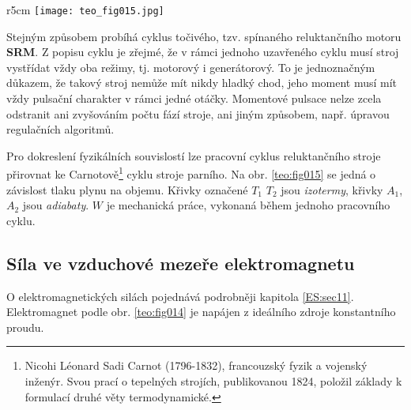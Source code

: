 {      \begin{wrapfigure}[12]{r}{5cm}  %
        \centering
        \texttt{[image: teo\_fig015.jpg]}
        \caption{Carnotův cyklus parního stroje.
                 (\cite[s.~165]{Patocka4})}
        \label{teo:fig015}
      \end{wrapfigure}
      Stejným způsobem probíhá cyklus točivého, tzv. spínaného reluktančního motoru \textbf{SRM}. Z 
      popisu cyklu je zřejmé, že v rámci jednoho uzavřeného cyklu musí stroj vystřídat vždy oba 
      režimy, tj. motorový i generátorový. To je jednoznačným důkazem, že takový stroj nemůže mít 
      nikdy hladký chod, jeho moment musí mít vždy pulsační charakter v rámci jedné otáčky. 
      Momentové pulsace nelze zcela odstranit ani zvyšováním počtu fází stroje, ani jiným způsobem, 
      např. úpravou regulačních algoritmů.

      Pro dokreslení fyzikálních souvislostí lze pracovní cyklus reluktančního stroje přirovnat ke 
      Carnotově\footnote{Nicohi Léonard Sadi Carnot (1796-1832), francouzský fyzik a vojenský 
      inženýr. Svou prací o tepelných strojích, publikovanou 1824, položil základy k formulací 
      druhé věty termodynamické.} cyklu stroje parního. Na obr. \ref{teo:fig015} se jedná o 
      závislost tlaku plynu na objemu. Křivky označené \(T_1\) \(T_2\) jsou \emph{izotermy}, křivky 
      \(A_1\), \(A_2\) jsou \emph{adiabaty}. \(W\) je mechanická práce, vykonaná během jednoho 
      pracovního cyklu.

      
    \subsection{Síla ve vzduchové mezeře elektromagnetu}
       O elektromagnetických silách pojednává podrobněji kapitola \ref{ES:sec11}. Elektromagnet 
       podle obr. \ref{teo:fig014} je napájen z ideálního zdroje konstantního proudu.
       
}
